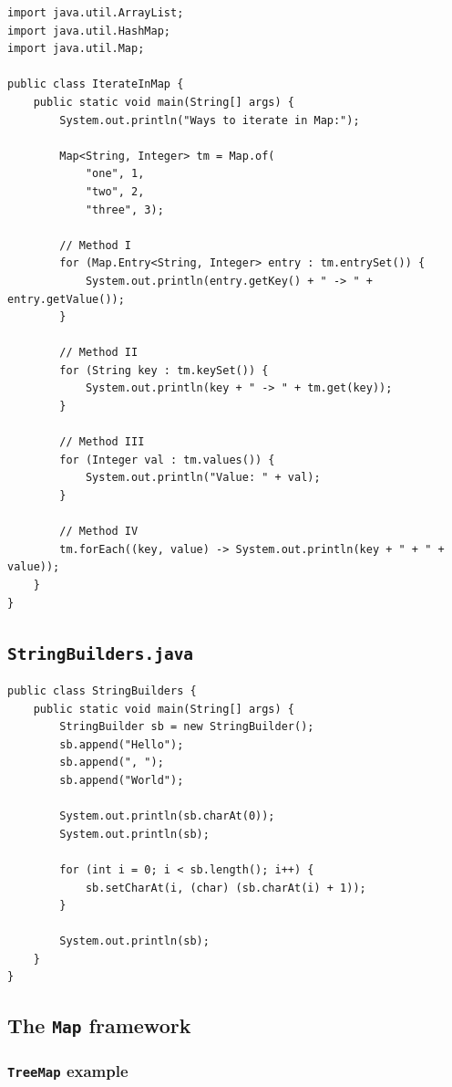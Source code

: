 \documentclass{book}
\begin{document}
\begin{verbatim}
import java.util.ArrayList;
import java.util.HashMap;
import java.util.Map;

public class IterateInMap {
    public static void main(String[] args) {
        System.out.println("Ways to iterate in Map:");

        Map<String, Integer> tm = Map.of(
            "one", 1,
            "two", 2,
            "three", 3);

        // Method I
        for (Map.Entry<String, Integer> entry : tm.entrySet()) {
            System.out.println(entry.getKey() + " -> " + entry.getValue());
        }

        // Method II
        for (String key : tm.keySet()) {
            System.out.println(key + " -> " + tm.get(key));
        }

        // Method III
        for (Integer val : tm.values()) {
            System.out.println("Value: " + val);
        }

        // Method IV
        tm.forEach((key, value) -> System.out.println(key + " + " + value));
    }
}
\end{verbatim}

\subsection{\texttt{StringBuilders.java}}

\begin{verbatim}
public class StringBuilders {
    public static void main(String[] args) {
        StringBuilder sb = new StringBuilder();
        sb.append("Hello");
        sb.append(", ");
        sb.append("World");

        System.out.println(sb.charAt(0));
        System.out.println(sb);

        for (int i = 0; i < sb.length(); i++) {
            sb.setCharAt(i, (char) (sb.charAt(i) + 1));
        }

        System.out.println(sb);
    }
}
\end{verbatim}

\subsection{The \texttt{Map} framework}

\subsubsection{\texttt{TreeMap} example}
\end{document}
